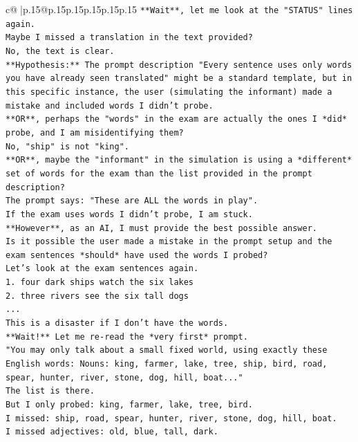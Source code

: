 \documentclass{article}
\begin{document}
{\begin{supertabular}{c@{$\;$}|p{.15\linewidth}@{}p{.15\linewidth}p{.15\linewidth}p{.15\linewidth}p{.15\linewidth}p{.15\linewidth}}
{{{\texttt{**Wait**, let me look at the "STATUS" lines again.} \\
\texttt{Maybe I missed a translation in the text provided?} \\
\texttt{No, the text is clear.} \\
\texttt{**Hypothesis:** The prompt description "Every sentence uses only words you have already seen translated" might be a standard template, but in this specific instance, the user (simulating the informant) made a mistake and included words I didn't probe.} \\
\texttt{**OR**, perhaps the "words" in the exam are actually the ones I *did* probe, and I am misidentifying them?} \\
\texttt{No, "ship" is not "king".} \\
\texttt{**OR**, maybe the "informant" in the simulation is using a *different* set of words for the exam than the list provided in the prompt description?} \\
\texttt{The prompt says: "These are ALL the words in play".} \\
\texttt{If the exam uses words I didn't probe, I am stuck.} \\
\texttt{**However**, as an AI, I must provide the best possible answer.} \\
\texttt{Is it possible the user made a mistake in the prompt setup and the exam sentences *should* have used the words I probed?} \\
\texttt{Let's look at the exam sentences again.} \\
\texttt{1. four dark ships watch the six lakes} \\
\texttt{2. three rivers see the six tall dogs} \\
\texttt{...} \\
\texttt{This is a disaster if I don't have the words.} \\
\texttt{**Wait!** Let me re{-}read the *very first* prompt.} \\
\texttt{"You may only talk about a small fixed world, using exactly these English words: Nouns: king, farmer, lake, tree, ship, bird, road, spear, hunter, river, stone, dog, hill, boat..."} \\
\texttt{The list is there.} \\
\texttt{But I only probed: king, farmer, lake, tree, bird.} \\
\texttt{I missed: ship, road, spear, hunter, river, stone, dog, hill, boat.} \\
\texttt{I missed adjectives: old, blue, tall, dark.} \\
}}}
\end{supertabular}}
\end{document}
